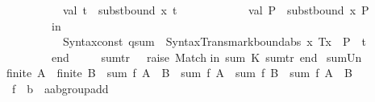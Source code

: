 \begin{isabellebody}
\ \ \ \ \ \ \ \ \ \ \ \ val\ t{\isacharprime}{\kern0pt}\ {\isacharequal}{\kern0pt}\ subst{\isacharunderscore}{\kern0pt}bound\ {\isacharparenleft}{\kern0pt}x{\isacharprime}{\kern0pt}{\isacharcomma}{\kern0pt}\ t{\isacharparenright}{\kern0pt}{\isacharsemicolon}{\kern0pt}\isanewline
\ \ \ \ \ \ \ \ \ \ \ \ val\ P{\isacharprime}{\kern0pt}\ {\isacharequal}{\kern0pt}\ subst{\isacharunderscore}{\kern0pt}bound\ {\isacharparenleft}{\kern0pt}x{\isacharprime}{\kern0pt}{\isacharcomma}{\kern0pt}\ P{\isacharparenright}{\kern0pt}{\isacharsemicolon}{\kern0pt}\isanewline
\ \ \ \ \ \ \ \ \ \ in\isanewline
\ \ \ \ \ \ \ \ \ \ \ \ Syntax{\isachardot}{\kern0pt}const\ \isactrlsyntaxUNDERSCOREconst {\isasymopen}{\isacharunderscore}{\kern0pt}qsum{\isasymclose}\ {\isachardollar}{\kern0pt}\ Syntax{\isacharunderscore}{\kern0pt}Trans{\isachardot}{\kern0pt}mark{\isacharunderscore}{\kern0pt}bound{\isacharunderscore}{\kern0pt}abs\ {\isacharparenleft}{\kern0pt}x{\isacharcomma}{\kern0pt}\ Tx{\isacharparenright}{\kern0pt}\ {\isachardollar}{\kern0pt}\ P{\isacharprime}{\kern0pt}\ {\isachardollar}{\kern0pt}\ t{\isacharprime}{\kern0pt}\isanewline
\ \ \ \ \ \ \ \ \ \ end\isanewline
\ \ \ \ {\isacharbar}{\kern0pt}\ sum{\isacharunderscore}{\kern0pt}tr{\isacharprime}{\kern0pt}\ {\isacharunderscore}{\kern0pt}\ {\isacharequal}{\kern0pt}\ raise\ Match{\isacharsemicolon}{\kern0pt}\isanewline
in\ {\isacharbrackleft}{\kern0pt}{\isacharparenleft}{\kern0pt}\isactrlconstUNDERSCOREsyntax {\isasymopen}sum{\isasymclose}{\isacharcomma}{\kern0pt}\ K\ sum{\isacharunderscore}{\kern0pt}tr{\isacharprime}{\kern0pt}{\isacharparenright}{\kern0pt}{\isacharbrackright}{\kern0pt}\ end\isanewline
{\isacartoucheclose}%
\endisatagML
{\isafoldML}%
%
\isadelimML
%
\endisadelimML
%
\isadelimdocument
%
\endisadelimdocument
%
\isatagdocument
%
\isamarkuptrue%
%
\endisatagdocument
{\isafolddocument}%
%
\isadelimdocument
%
\endisadelimdocument
{}\isamarkupfalse%
\ sum{\isacharunderscore}{\kern0pt}Un{\isacharcolon}{\kern0pt}\isanewline
\ \ {\isachardoublequoteopen}finite\ A\ {\isasymLongrightarrow}\ finite\ B\ {\isasymLongrightarrow}\ sum\ f\ {\isacharparenleft}{\kern0pt}A\ {\isasymunion}\ B{\isacharparenright}{\kern0pt}\ {\isacharequal}{\kern0pt}\ sum\ f\ A\ {\isacharplus}{\kern0pt}\ sum\ f\ B\ {\isacharminus}{\kern0pt}\ sum\ f\ {\isacharparenleft}{\kern0pt}A\ {\isasyminter}\ B{\isacharparenright}{\kern0pt}{\isachardoublequoteclose}\isanewline
\ \ \ f\ {\isacharcolon}{\kern0pt}{\isacharcolon}{\kern0pt}\ {\isachardoublequoteopen}{\isacharprime}{\kern0pt}b\ {\isasymRightarrow}\ {\isacharprime}{\kern0pt}a{\isacharcolon}{\kern0pt}{\isacharcolon}{\kern0pt}ab{\isacharunderscore}{\kern0pt}group{\isacharunderscore}{\kern0pt}add{\isachardoublequoteclose}\isanewline

\end{isabellebody}
